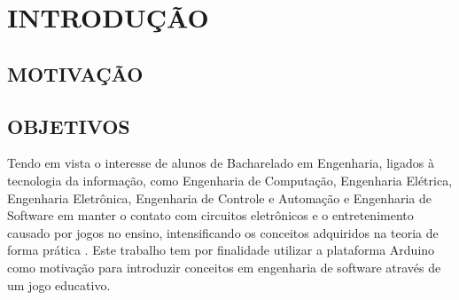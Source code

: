 
\chapter{INTRODUÇÃO}
\label{chap:introducao}

\section{MOTIVAÇÃO}
\label{sec:motivacao}

\section{OBJETIVOS}
\label{sec:objetivos}

Tendo em vista o interesse de alunos de Bacharelado em Engenharia, ligados à tecnologia da informação, como Engenharia de Computação, Engenharia Elétrica, Engenharia Eletrônica, Engenharia de Controle e Automação e Engenharia de Software em manter o contato com circuitos eletrônicos e o entretenimento causado por jogos no ensino, intensificando os conceitos adquiridos na teoria de forma prática \cite{thiry2010}. Este trabalho tem por finalidade utilizar a plataforma Arduino como motivação para introduzir conceitos em engenharia de software através de um jogo educativo.